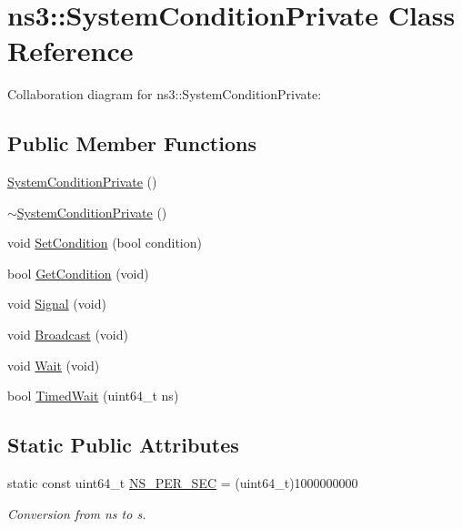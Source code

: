 \hypertarget{classns3_1_1SystemConditionPrivate}{}\section{ns3\+:\+:System\+Condition\+Private Class Reference}
\label{classns3_1_1SystemConditionPrivate}


Collaboration diagram for ns3\+:\+:System\+Condition\+Private\+:
\subsection*{Public Member Functions}
\begin{DoxyCompactItemize}
\item 
\hyperlink{classns3_1_1SystemConditionPrivate_abe3fc50cee109405355a7d56d24ce756}{System\+Condition\+Private} ()
\item 
\hyperlink{classns3_1_1SystemConditionPrivate_a4b680c47b2ba5b30d07dbc4b5845d71b}{$\sim$\+System\+Condition\+Private} ()
\item 
void \hyperlink{classns3_1_1SystemConditionPrivate_a195e038524b1efa106049a0358af99d5}{Set\+Condition} (bool condition)
\item 
bool \hyperlink{classns3_1_1SystemConditionPrivate_a304f88722c58b734ebfc701f702c844c}{Get\+Condition} (void)
\item 
void \hyperlink{classns3_1_1SystemConditionPrivate_a0213a8ffd678629df223ec9f890aa413}{Signal} (void)
\item 
void \hyperlink{classns3_1_1SystemConditionPrivate_ab7839aa1aae74cad0bb6cc8cc1cdfb27}{Broadcast} (void)
\item 
void \hyperlink{classns3_1_1SystemConditionPrivate_ac2e3dfcd1eef3271602eaef7634351f1}{Wait} (void)
\item 
bool \hyperlink{classns3_1_1SystemConditionPrivate_a9c5f7d03c27f1986c56dabe609798b8a}{Timed\+Wait} (uint64\+\_\+t ns)
\end{DoxyCompactItemize}
\subsection*{Static Public Attributes}
\begin{DoxyCompactItemize}
\item 
static const uint64\+\_\+t \hyperlink{classns3_1_1SystemConditionPrivate_a677a08c18d846d886ad1b3b251d48d9b}{N\+S\+\_\+\+P\+E\+R\+\_\+\+S\+EC} = (uint64\+\_\+t)1000000000
\begin{DoxyCompactList}\small\item\em Conversion from ns to s. \end{DoxyCompactList}\end{DoxyCompactItemize}
